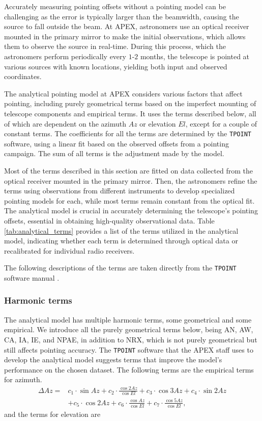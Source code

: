 Accurately measuring pointing offsets without a pointing model can be challenging as the error is typically larger than the beamwidth, causing the source to fall outside the beam. At APEX,
astronomers use an optical receiver mounted in the primary mirror to make the initial observations, which allows them to observe the source in real-time.
During this process, which the astronomers perform periodically every $1$-$2$ months, the telescope is pointed at various sources with known locations, yielding both input and observed coordinates.

The analytical pointing model at APEX considers various factors that affect pointing, including purely geometrical terms based on the imperfect mounting of telescope components and empirical terms.
It uses the terms described below, all of which are dependent on the azimuth $Az$ or elevation $El$, except for a couple of constant terms.
The coefficients for all the terms are determined by the \texttt{TPOINT} \cite{tpoint_manual} software, using a linear fit based on the observed offsets from a pointing campaign.
The sum of all terms is the adjustment made by the model.

Most of the terms described in this section are fitted on data collected from the optical receiver mounted in the primary mirror.
Then, the astronomers refine the terms using observations from different instruments to develop specialized pointing models for each, while most terms remain constant from the optical fit.
The analytical model is crucial in accurately determining the telescope's pointing offsets, essential in obtaining high-quality observational data.
Table \ref{tab:analytical_terms} provides a list of the terms utilized in the analytical model,
indicating whether each term is determined through optical data or recalibrated for individual radio receivers.

The following descriptions of the terms are taken directly from the \texttt{TPOINT} software manual \cite{tpoint_manual}.
\subsubsection{Harmonic terms}
The analytical model has multiple harmonic terms, some geometrical and some empirical.
We introduce all the purely geometrical terms below, being AN, AW, CA, IA, IE, and NPAE, in addition to NRX, which is not purely geometrical but still affects pointing accuracy.
The \texttt{TPOINT} software that the APEX staff uses to develop the analytical model suggests terms that improve the model's performance on the chosen dataset.
The following terms are the empirical terms for azimuth.
\begin{align}\label{eq:analytical_az}
    \Delta Az =&  c_1 \cdot \sin{Az} + c_2 \cdot \frac{\cos{2Az}}{\cos{El}} + c_3 \cdot \cos{3Az} + c_4 \cdot \sin{2Az} \\
    &+ c_5 \cdot \cos{2Az} + c_6 \cdot \frac{\cos{Az}}{\cos{El}} + c_7 \cdot \frac{\cos{5Az}}{\cos{El}},
\end{align}
and the terms for elevation are

